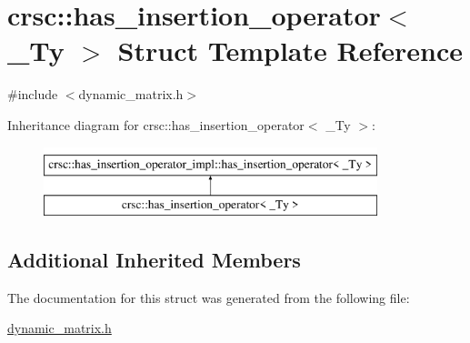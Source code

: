 \hypertarget{structcrsc_1_1has__insertion__operator}{}\section{crsc\+:\+:has\+\_\+insertion\+\_\+operator$<$ \+\_\+\+Ty $>$ Struct Template Reference}
\label{structcrsc_1_1has__insertion__operator}


{\ttfamily \#include $<$dynamic\+\_\+matrix.\+h$>$}

Inheritance diagram for crsc\+:\+:has\+\_\+insertion\+\_\+operator$<$ \+\_\+\+Ty $>$\+:\begin{figure}[H]
\begin{center}
\leavevmode
\includegraphics[height=2.000000cm]{structcrsc_1_1has__insertion__operator}
\end{center}
\end{figure}
\subsection*{Additional Inherited Members}


The documentation for this struct was generated from the following file\+:\begin{DoxyCompactItemize}
\item 
\hyperlink{dynamic__matrix_8h}{dynamic\+\_\+matrix.\+h}\end{DoxyCompactItemize}

